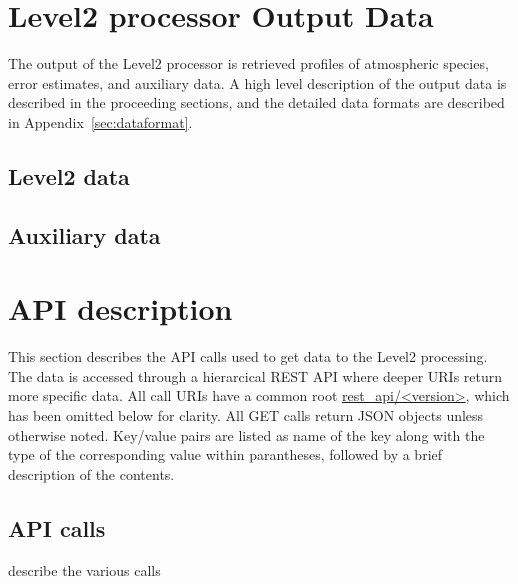 \section{Level2 processor Output Data}
The output of the Level2 processor is retrieved
profiles of atmospheric species, error estimates,
and auxiliary data.
A high level description of the output data is described
in the proceeding sections, and the detailed data formats
are described in Appendix~\ref{sec:dataformat}.  

\subsection{Level2 data}
\subsection{Auxiliary data}

\section{API description}
\label{sec:api}

This section describes the API calls used to get data 
to the Level2 processing.
The data is accessed through a hierarcical REST API where deeper URIs return more
specific data.  All call URIs have a common root \url{rest_api/<version>}, which
has been omitted below for clarity.  All GET calls return JSON objects unless
otherwise noted. Key/value pairs are listed as name of the key
along with the type of the corresponding value within parantheses, followed
by a brief description of the contents.  


\subsection{API calls}

describe the various calls



